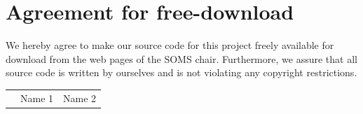 \documentclass[11pt]{article}
\begin{document}

\newpage


\newpage
\section*{Agreement for free-download}
\bigskip


\bigskip


\large We hereby agree to make our source code for this project freely available for download from the web pages of the SOMS chair. Furthermore, we assure that all source code is written by ourselves and is not violating any copyright restrictions.

\begin{center}

\bigskip


\bigskip


\begin{tabular}{@{}p{3.3cm}@{}p{6cm}@{}@{}p{6cm}@{}}
\begin{minipage}{3cm}

\end{minipage}
&
\begin{minipage}{6cm}
\vspace{2mm} \large Name 1

 \vspace{\baselineskip}

\end{minipage}
&
\begin{minipage}{6cm}

\large Name 2

\end{minipage}
\end{tabular}


\end{center}
\newpage







\tableofcontents

\newpage

\end{document}

